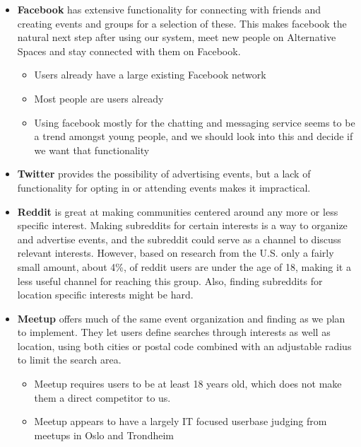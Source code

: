 \begin{itemize}
  \item \textbf{Facebook} has extensive functionality for connecting with friends and creating events and groups for a selection of these. This makes facebook the natural next step after using our system, meet new people on Alternative Spaces and stay connected with them on Facebook. \begin{itemize}
    \item Users already have a large existing Facebook network
    \item Most people are users already
    \item Using facebook mostly for the chatting and messaging service seems to be a trend amongst young people, and we should look into this and decide if we want that functionality
  \end{itemize}
  \item \textbf{Twitter} provides the possibility of advertising events, but a lack of functionality for opting in or attending events makes it impractical.
  \item \textbf{Reddit}  is great at making communities centered around any more or less specific interest. Making subreddits for certain interests is a way to organize and advertise events, and the subreddit could serve as a channel to discuss relevant interests. However, based on research from the U.S. only a fairly small amount, about 4\%, of reddit users are under the age of 18, making it a less useful channel for reaching this group. Also, finding subreddits for location specific interests might be hard.
  \item \textbf{Meetup} offers much of the same event organization and finding as we plan to implement. They let users define searches through interests as well as location, using both cities or postal code combined with an adjustable radius to limit the search area. \begin{itemize}
    \item Meetup requires users to be at least 18 years old, which does not make them a direct competitor to us.
    \item Meetup appears to have a largely IT focused userbase judging from meetups in Oslo and Trondheim
  \end{itemize}
\end{itemize}


